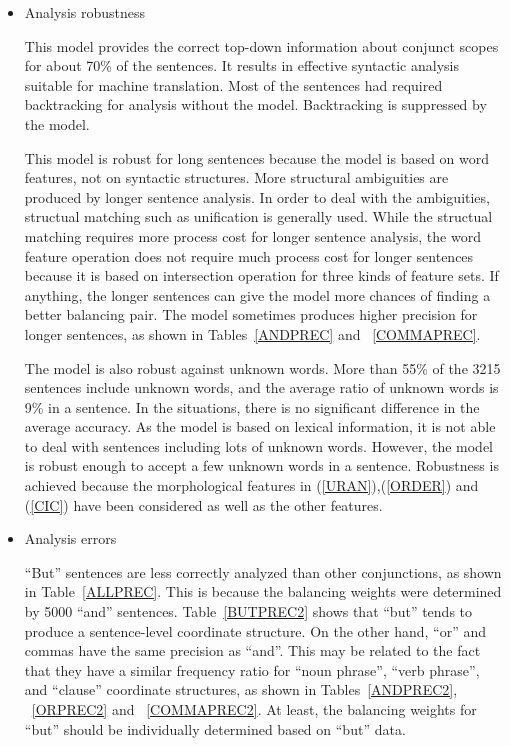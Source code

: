 \vspace{-0.5cm}
  \begin{itemize}

    \item  Analysis robustness

This model provides the correct top-down information about
conjunct scopes for about 70\% of the sentences. It results in
effective syntactic analysis suitable for machine translation.  Most of the
sentences had required backtracking for analysis without the
model. Backtracking is suppressed by the model.

This model is robust for long sentences because the model is based on
word features, not on syntactic structures.  More structural
ambiguities are produced by longer sentence analysis.  In order to
deal with the ambiguities, structual matching such as unification is
generally used. While the structual matching requires more process
cost for longer sentence analysis, the word feature operation does not
require much process cost for longer sentences because it is based on
intersection operation for three kinds of feature sets.
If anything, the
longer sentences can give the model more chances of finding a better
balancing pair.  The model sometimes produces higher precision for longer
sentences, as shown in Tables~\ref{ANDPREC} and ~\ref{COMMAPREC}.

The model is also robust against unknown words. More than 55\% of the
3215 sentences include unknown words, and the average ratio of
unknown words is 9\% in a sentence. In the situations, there is no
significant difference in the average accuracy. As the model is based
on lexical information, it is not able to deal with sentences
including lots of unknown words. However, the model is robust enough to
accept a few unknown words in a sentence. Robustness is achieved
because the morphological features in (\ref{URAN}),(\ref{ORDER}) and
(\ref{CIC}) have been considered as well as the other features.

  \item  Analysis errors

``But'' sentences are less correctly analyzed than other conjunctions,
as shown in Table~\ref{ALLPREC}.  This is because the balancing
weights were determined by 5000 ``and'' sentences.
Table~\ref{BUTPREC2} shows that ``but'' tends to produce a sentence-level
coordinate structure.  On the other hand, ``or'' and commas have the same
precision as ``and''. This may be related to the fact that they have
a similar frequency ratio for ``noun phrase'', ``verb phrase'', and
``clause'' coordinate structures, as shown in Tables~\ref{ANDPREC2},
~\ref{ORPREC2} and ~\ref{COMMAPREC2}. At least, the
balancing weights for ``but'' should be individually determined based
on ``but'' data. 


\end{itemize}
